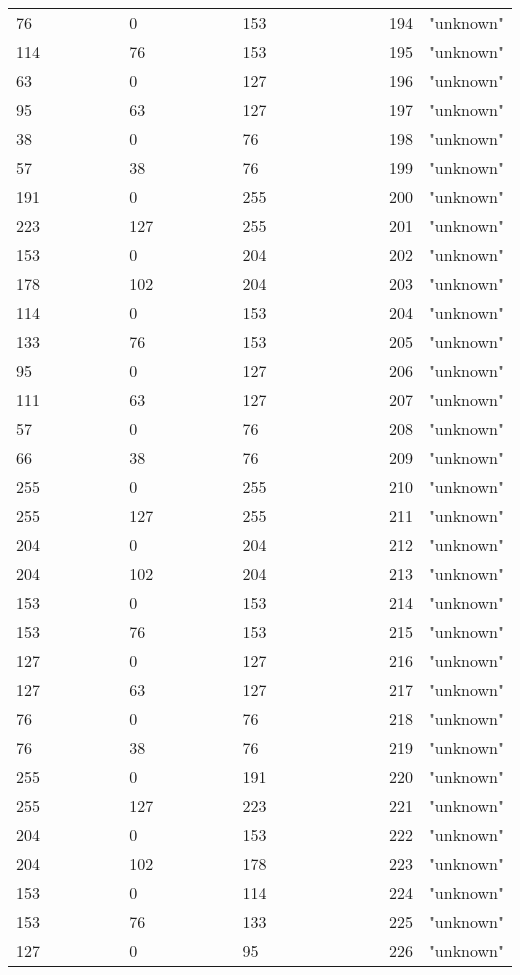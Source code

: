 \begin{longtable}{p{0.3\linewidth} p{0.3\linewidth} p{0.4\linewidth}}
 76 &    0 &  153 &  194 &  "unknown"\\
114 &   76 &  153 &  195 &  "unknown"\\
 63 &    0 &  127 &  196 &  "unknown"\\
 95 &   63 &  127 &  197 &  "unknown"\\
 38 &    0 &   76 &  198 &  "unknown"\\
 57 &   38 &   76 &  199 &  "unknown"\\
191 &    0 &  255 &  200 &  "unknown"\\
223 &  127 &  255 &  201 &  "unknown"\\
153 &    0 &  204 &  202 &  "unknown"\\
178 &  102 &  204 &  203 &  "unknown"\\
114 &    0 &  153 &  204 &  "unknown"\\
133 &   76 &  153 &  205 &  "unknown"\\
 95 &    0 &  127 &  206 &  "unknown"\\
111 &   63 &  127 &  207 &  "unknown"\\
 57 &    0 &   76 &  208 &  "unknown"\\
 66 &   38 &   76 &  209 &  "unknown"\\
255 &    0 &  255 &  210 &  "unknown"\\
255 &  127 &  255 &  211 &  "unknown"\\
204 &    0 &  204 &  212 &  "unknown"\\
204 &  102 &  204 &  213 &  "unknown"\\
153 &    0 &  153 &  214 &  "unknown"\\
153 &   76 &  153 &  215 &  "unknown"\\
127 &    0 &  127 &  216 &  "unknown"\\
127 &   63 &  127 &  217 &  "unknown"\\
 76 &    0 &   76 &  218 &  "unknown"\\
 76 &   38 &   76 &  219 &  "unknown"\\
255 &    0 &  191 &  220 &  "unknown"\\
255 &  127 &  223 &  221 &  "unknown"\\
204 &    0 &  153 &  222 &  "unknown"\\
204 &  102 &  178 &  223 &  "unknown"\\
153 &    0 &  114 &  224 &  "unknown"\\
153 &   76 &  133 &  225 &  "unknown"\\
127 &    0 &   95 &  226 &  "unknown"\\

\end{longtable}
